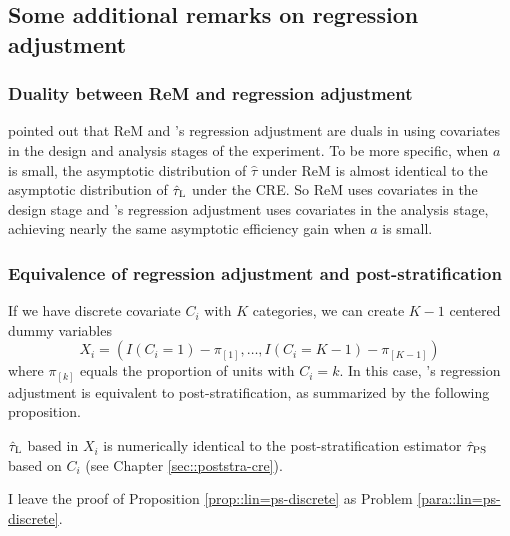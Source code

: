 \subsection{Some additional remarks on regression adjustment}


\subsubsection{Duality between ReM and regression adjustment}
\citet{li2018asymptotic} pointed out that ReM and \citet{lin2013}'s regression adjustment are duals in using covariates in the design and analysis stages of the experiment. To be more specific, when $a$ is small,  the asymptotic distribution of $\hat{\tau}$ under ReM is almost identical to the asymptotic distribution of $\hat{\tau}_\textsc{L}$ under the CRE. So ReM uses covariates in the design stage and \citet{lin2013}'s regression adjustment uses covariates in the analysis stage, achieving nearly the same asymptotic efficiency gain when $a$ is small. 


 \subsubsection{Equivalence of regression adjustment and post-stratification}
If we have discrete covariate $C_i$ with $K$ categories, we can create $K-1$ centered dummy variables 
$$
X_i = ( I(C_i=1) - \pi_{[1]}, \ldots,   I(C_i=K-1) - \pi_{[K-1]})
$$ 
where $\pi_{[k]}$ equals the proportion of units with $C_i = k$. 
In this case, \citet{lin2013}'s regression adjustment is equivalent to post-stratification, as summarized by the following proposition. 

\begin{proposition}
\label{prop::lin=ps-discrete}
$\hat{\tau}_\textsc{L}$ based in $X_i$ is numerically identical to the post-stratification estimator $\hat{\tau}_\textsc{PS}$ based on $C_i$ (see Chapter \ref{sec::poststra-cre}). 
\end{proposition}


I leave the proof of Proposition \ref{prop::lin=ps-discrete} as Problem \ref{para::lin=ps-discrete}. 


